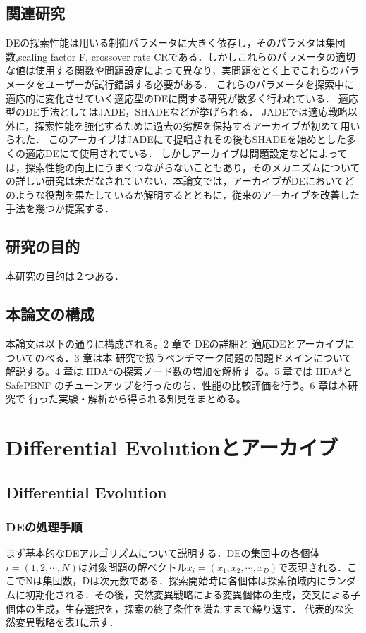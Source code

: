 \documentclass[a4paper,11pt,oneside,openany]{jsbook}
\begin{document}
\section{関連研究}
DEの探索性能は用いる制御パラメータに大きく依存し，そのパラメタは集団数,scaling factor F, crossover rate CRである．しかしこれらのパラメータの適切な値は使用する関数や問題設定によって異なり，実問題をとく上でこれらのパラメータをユーザーが試行錯誤する必要がある．
これらのパラメータを探索中に適応的に変化させていく適応型のDEに関する研究が数多く行われている．
適応型のDE手法としてはJADE\cite{JADE}，SHADE\cite{SHADE}などが挙げられる．
JADEでは適応戦略以外に，探索性能を強化するために過去の劣解を保持するアーカイブが初めて用いられた．
このアーカイブはJADEにて提唱されその後もSHADEを始めとした多くの適応DEにて使用されている．
しかしアーカイブは問題設定などによっては，探索性能の向上にうまくつながらないこともあり，そのメカニズムについての詳しい研究は未だなされていない．本論文では，アーカイブがDEにおいてどのような役割を果たしているか解明するとともに，従来のアーカイブを改善した手法を幾つか提案する．

\section{研究の目的}
本研究の目的は２つある．

\section{本論文の構成}
本論文は以下の通りに構成される。2 章で DEの詳細と 適応DEとアーカイブについてのべる．3 章は本
研究で扱うベンチマーク問題の問題ドメインについて解説する。4 章は HDA*の探索ノード数の増加を解析す
る。5 章では HDA*と SafePBNF のチューンアップを行ったのち、性能の比較評価を行う。6 章は本研究で
行った実験・解析から得られる知見をまとめる。


\chapter{Differential Evolutionとアーカイブ}
\section{Differential Evolution}
\subsection{DEの処理手順}
まず基本的なDEアルゴリズムについて説明する．DEの集団中の各個体${i} = (1, 2, \cdots, N)$は対象問題の解ベクトル${x_i} = (x_1, x_2, \cdots, x_D)$で表現される．ここでNは集団数，Dは次元数である．探索開始時に各個体は探索領域内にランダムに初期化される．その後，突然変異戦略による変異個体の生成，交叉による子個体の生成，生存選択を，探索の終了条件を満たすまで繰り返す．
代表的な突然変異戦略を表1に示す．
\end{document}
